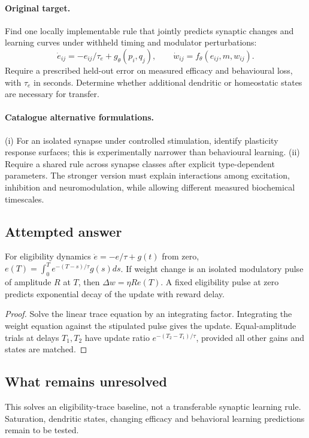 \documentclass[11pt]{article}
\begin{document}
\paragraph{Original target.}
Find one locally implementable rule that jointly predicts synaptic changes and learning curves under withheld timing and modulator perturbations:
\[
\dot e_{ij}=-e_{ij}/\tau_e+g_\theta(p_i,q_j),\qquad
\dot w_{ij}=f_\theta(e_{ij},m,w_{ij}).
\]
Require a prescribed held-out error on measured efficacy and behavioural loss, with $\tau_e$ in seconds. Determine whether additional dendritic or homeostatic states are necessary for transfer.
\paragraph{Catalogue alternative formulations.}
(i) For an isolated synapse under controlled stimulation, identify plasticity response surfaces; this is experimentally narrower than behavioural learning. (ii) Require a shared rule across synapse classes after explicit type-dependent parameters. The stronger version must explain interactions among excitation, inhibition and neuromodulation, while allowing different measured biochemical timescales.
\subsection{Attempted answer}
\begin{proposition}
For eligibility dynamics $\dot e=-e/\tau+g(t)$ from zero, $e(T)=\int_0^Te^{-(T-s)/\tau}g(s)ds$. If weight change is an isolated modulatory pulse of amplitude $R$ at $T$, then $\Delta w=\eta R e(T)$. A fixed eligibility pulse at zero predicts exponential decay of the update with reward delay.
\end{proposition}
\begin{proof}
Solve the linear trace equation by an integrating factor. Integrating the weight equation against the stipulated pulse gives the update. Equal-amplitude trials at delays $T_1,T_2$ have update ratio $e^{-(T_2-T_1)/\tau}$, provided all other gains and states are matched.
\end{proof}
\subsection{What remains unresolved}
This solves an eligibility-trace baseline, not a transferable synaptic learning rule. Saturation, dendritic states, changing efficacy and behavioral learning predictions remain to be tested.
\end{document}
